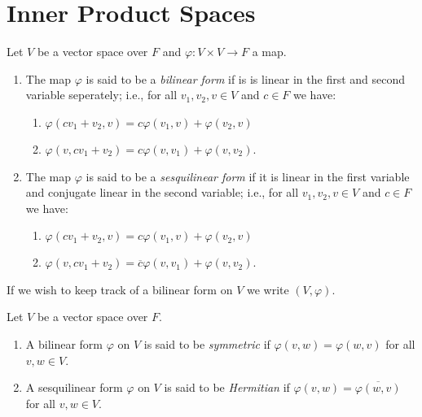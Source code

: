\section{Inner Product Spaces}

    \begin{definition}
        Let $V$ be a vector space over $F$ and $\varphi:V \times V \rightarrow F$ a map.
            \begin{enumerate}[label = (\arabic*),itemsep=0pt,topsep=3pt]
                \item The map $\varphi$ is said to be a \textit{bilinear form} if is is linear in the first and second variable seperately; i.e., for all $v_1,v_2,v \in V$ and $c \in F$ we have:
                    \begin{enumerate}[label = (\roman*),itemsep=1pt,topsep=0pt]
                        \item $\varphi(cv_1 +v_2,v) = c\varphi(v_1,v) + \varphi(v_2,v)$
                        \item $\varphi(v,cv_1 + v_2) = c\varphi(v,v_1) + \varphi(v,v_2)$.
                    \end{enumerate}

                \item The map $\varphi$ is said to be a \textit{sesquilinear form} if it is linear in the first variable and conjugate linear in the second variable; i.e., for all $v_1,v_2,v \in V$ and $c \in F$ we have:
                    \begin{enumerate}[label = (\roman*),itemsep=1pt,topsep=0pt]
                        \item $\varphi(cv_1 +v_2,v) = c\varphi(v_1,v) + \varphi(v_2,v)$
                        \item $\varphi(v,cv_1 + v_2) = \overline{c}\varphi(v,v_1) + \varphi(v,v_2)$.
                    \end{enumerate}
            \end{enumerate}
        If we wish to keep track of a bilinear form on $V$ we write $(V,\varphi)$.
    \end{definition}

    \begin{definition}
        Let $V$ be a vector space over $F$.
            \begin{enumerate}[label = (\arabic*),itemsep=1pt,topsep=3pt]
                \item A bilinear form $\varphi$ on $V$ is said to be \textit{symmetric} if $\varphi(v,w) = \varphi(w,v)$ for all $v,w \in V$.
                \item A sesquilinear form $\varphi$ on $V$ is said to be \textit{Hermitian} if $\varphi(v,w) = \overline{\varphi(w,v)}$ for all $v,w \in V$.
            \end{enumerate}
    \end{definition}

